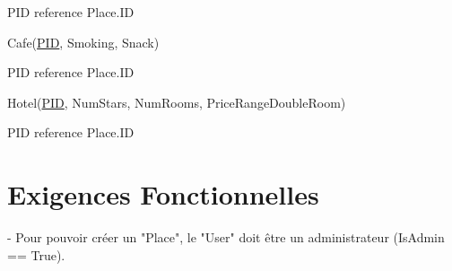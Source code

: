 \documentclass[a4paper,10pt]{article}
\begin{document}
PID reference Place.ID

\hspace{-0,5cm}Cafe(\underline{PID}, Smoking, Snack)

PID reference Place.ID

\hspace{-0,5cm}Hotel(\underline{PID}, NumStars, NumRooms, PriceRangeDoubleRoom)

PID reference Place.ID

\section{Exigences Fonctionnelles}

- Pour pouvoir créer un "Place", le "User" doit être un administrateur (IsAdmin == True).
\end{document}
